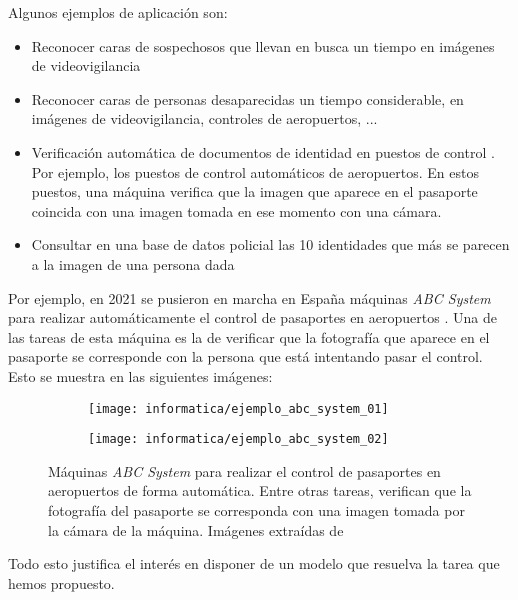 Algunos ejemplos de aplicación son:

\begin{itemize}
    \item Reconocer caras de sospechosos que llevan en busca un tiempo en imágenes de videovigilancia
    \item Reconocer caras de personas desaparecidas un tiempo considerable, en imágenes de videovigilancia, controles de aeropuertos, ...
    \item Verificación automática de documentos de identidad en puestos de control \cite{informatica:tecnica_sintesis_aifr}. Por ejemplo, los puestos de control automáticos de aeropuertos. En estos puestos, una máquina verifica que la imagen que aparece en el pasaporte coincida con una imagen tomada en ese momento con una cámara.
    \item Consultar en una base de datos policial las 10 identidades que más se parecen a la imagen de una persona dada
\end{itemize}

Por ejemplo, en 2021 se pusieron en marcha en España máquinas \textit{ABC System} para realizar automáticamente el control de pasaportes en aeropuertos \cite{informatica:articulo_abc_system}. Una de las tareas de esta máquina es la de verificar que la fotografía que aparece en el pasaporte se corresponde con la persona que está intentando pasar el control. Esto se muestra en las siguientes imágenes:

\begin{figure}[H]
    \centering
    \begin{subfigure}{0.4\textwidth}
        \texttt{[image: informatica/ejemplo\_abc\_system\_01]}
    \end{subfigure}
    \begin{subfigure}{0.4\textwidth}
        \texttt{[image: informatica/ejemplo\_abc\_system\_02]}
    \end{subfigure}

    \caption{Máquinas \textit{ABC System} para realizar el control de pasaportes en aeropuertos de forma automática. Entre otras tareas, verifican que la fotografía del pasaporte se corresponda con una imagen tomada por la cámara de la máquina. Imágenes extraídas de \cite{informatica:articulo_abc_system}}
\end{figure}

Todo esto justifica el interés en disponer de un modelo que resuelva la tarea que hemos propuesto.

